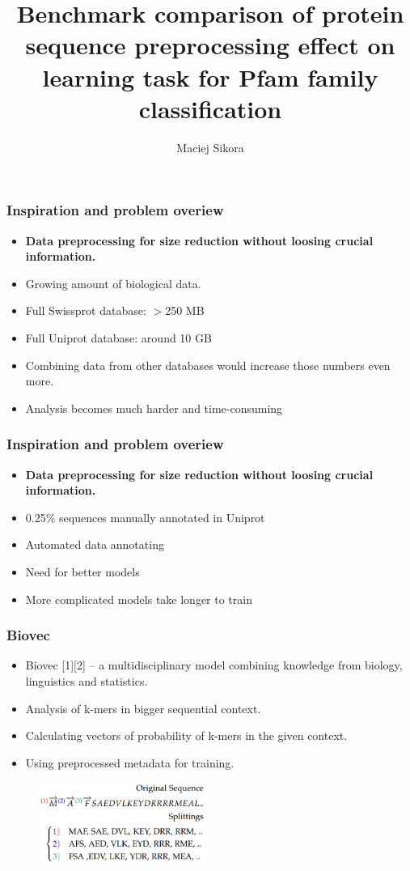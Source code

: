 \documentclass[10pt]{beamer}
\title{Benchmark comparison of protein sequence preprocessing effect on learning task for Pfam family classification}
\author{Maciej Sikora}
\begin{document}
\frame{\titlepage}


\begin{frame}
\frametitle{Inspiration and problem overiew}
\begin{itemize}
\item \textbf{Data preprocessing for size reduction without loosing crucial information.}
\end{itemize}

\begin{itemize}
\item Growing amount of biological data.
\item Full Swissprot database:  $>$250 MB
\item Full Uniprot database: around 10 GB
\item Combining data from other databases would increase those numbers even more.
\item Analysis becomes much harder and time-consuming
\end{itemize}
\end{frame}

\begin{frame}
\frametitle{Inspiration and problem overiew}
\begin{itemize}
\item \textbf{Data preprocessing for size reduction without loosing crucial information.}
\end{itemize}

\begin{itemize}
\item 0.25\% sequences manually annotated in Uniprot
\item Automated data annotating
\item Need for better models
\item More complicated models take longer to train
\end{itemize}
\end{frame}

\begin{frame}
\frametitle{Biovec}
\begin{itemize}
\item Biovec [1][2] -- a multidisciplinary model combining knowledge from biology, linguistics and statistics.
\item Analysis of k-mers in bigger sequential context.
\item Calculating vectors of probability of k-mers in the given context.
\item Using preprocessed metadata for training.
\end{itemize}
\begin{figure}[H]
\begin{center}
\includegraphics[width=0.5\textwidth]{biovec}
\end{center}
\end{figure}
\end{frame}
\end{document}
